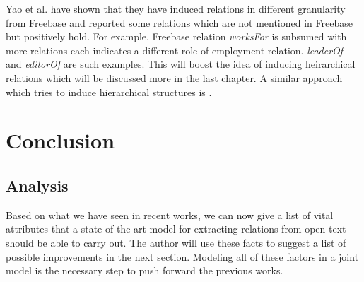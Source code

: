 \documentclass[12pt]{report}
\begin{document}
 Yao et al. have shown that they have induced relations in different granularity from Freebase and reported some relations
 which are not mentioned in Freebase but positively hold. For example, Freebase relation \emph{worksFor}
  is subsumed with more relations each indicates a different role of employment relation. \emph{leaderOf}
   and \emph{editorOf} are such examples. This will boost the idea of inducing heirarchical 
   relations which will be discussed more in the last chapter. A similar approach which tries to induce
    hierarchical structures is \cite{Alfonseca2012} .
 
 

\chapter{Conclusion}
\label{ch:conclusion}

\section{Analysis}
\label{ch:conclusion}

Based on what we have seen in recent works, we can now give a list of vital
attributes that a state-of-the-art model for extracting relations from open text
should be able to carry out. The author will use these facts to suggest a list of possible improvements
in the next section. Modeling all of
these factors in a joint model is the necessary step to push forward the previous
works.
\end{document}
